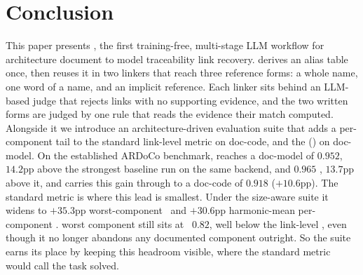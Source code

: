 \section{Conclusion}
\label{sec:conclusion}

This paper presents \approach, the first training-free, multi-stage \ac{LLM} workflow for architecture document to model traceability link recovery.
\approach derives an alias table once, then reuses it in two linkers that reach three reference
forms: a whole name, one word of a name, and an implicit reference.
Each linker sits behind an \ac{LLM}-based judge that rejects links with no supporting evidence, and
the two written forms are judged by one rule that reads the evidence their match computed.
Alongside it we introduce an architecture-driven evaluation suite that adds a per-component tail to the standard link-level metric on doc-code, and the \cmrname{} (\cmr) on doc-model.
On the established ARDoCo benchmark, \approach{} reaches a doc-model \avgfone of $0.952$, $14.2$pp above the strongest baseline run on the same backend, and $0.965$ \avgftwo, $13.7$pp above it,
 and carries this gain through to a doc-code \avgfone of $0.918$ ($+10.6$pp).
The standard metric is where this lead is smallest.
Under the size-aware suite it widens to $+35.3$pp worst-component \fone\ and $+30.6$pp harmonic-mean per-component \fone.
\approach{} worst component still sits at \fone\ $0.82$, well below the link-level \fone, even though it no longer abandons any documented component outright.
So the suite earns its place by keeping this headroom visible, where the standard metric would call the task solved.
